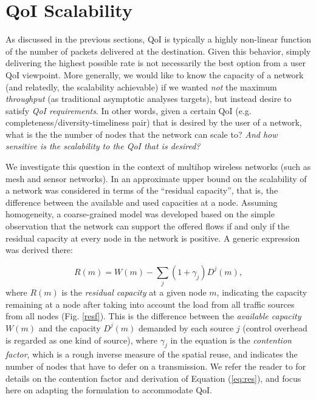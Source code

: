 
\section{QoI Scalability}
\label{sec:qoi_scalability}

As discussed in the previous sections, QoI %
is typically a highly
non-linear function of the number of packets delivered at the
destination. Given this behavior, simply
delivering the highest possible rate is not necessarily the best
option from a user QoI viewpoint. More generally, we would like to know
the capacity of a network (and relatedly, the scalability achievable)
if we wanted {\em not} the maximum {\em throughput} (as traditional
asymptotic analyses targets), but instead desire to satisfy {\em QoI requirements}. In other
words, given a certain QoI (e.g. completeness/diversity-timeliness pair) that is desired by the  user of a network,
what is the the number of nodes that the network can scale to?\emph{ And how
sensitive is the scalability to the QoI that is desired?}

We investigate this question in the context of multihop wireless networks
(such as mesh and sensor networks).
In \cite{scalability_manets_theory_vs_practice} an approximate upper bound on the
 scalability of a network was
considered in terms of the ``residual capacity'', that is, the difference
between the available and used capacities at a node. Assuming homogeneity, a
coarse-grained model was developed based on the simple observation
that the network can support the offered flows if and only if the
residual capacity at every node in the network is positive.  A generic
expression was derived there:


\begin{equation}
R(m) = W(m) - \sum_j (1+\gamma_j)D^j(m),
\label{eq:res}
\end{equation}
where $R(m)$ is the {\em residual capacity} at a given node $m$, indicating
the capacity remaining at a node after taking into account the load
from all traffic sources from all nodes (Fig. \ref{resf}). This is the difference
between the {\em available capacity} $W(m)$  and the capacity $D^j(m)$
demanded by
each source $j$ (control overhead is regarded as one kind of
source), where $\gamma_j$ in the equation is the {\em contention factor}, which is a rough inverse
measure of the spatial reuse, and indicates the number of  nodes that have
to defer on a transmission.
We refer the reader to \cite{scalability_manets_theory_vs_practice} for details on the contention factor
and derivation of Equation (\ref{eq:res}), and focus here on adapting the
formulation to accommodate QoI.

